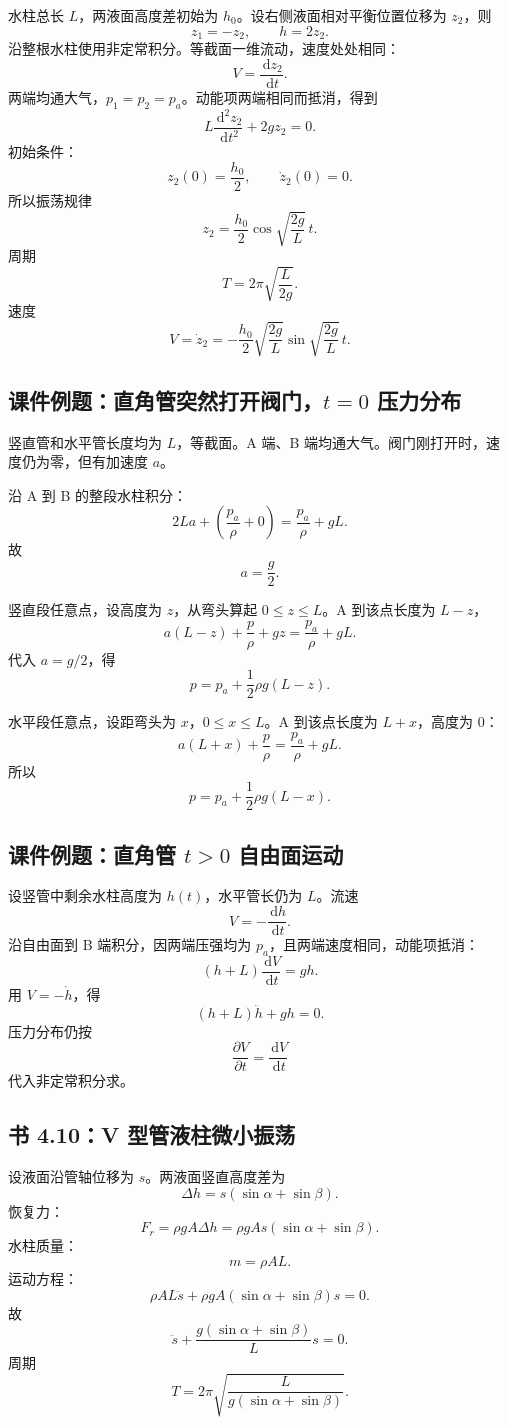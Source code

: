 ﻿\documentclass[UTF8,zihao=-4]{ctexart}
\newcommand{\dd}{\,\mathrm d}
\begin{document}
水柱总长 \(L\)，两液面高度差初始为 \(h_0\)。设右侧液面相对平衡位置位移为 \(z_2\)，则
\[
z_1=-z_2,\qquad h=2z_2.
\]
沿整根水柱使用非定常积分。等截面一维流动，速度处处相同：
\[
V=\frac{\dd z_2}{\dd t}.
\]
两端均通大气，\(p_1=p_2=p_a\)。动能项两端相同而抵消，得到
\[
L\frac{\dd^2z_2}{\dd t^2}+2gz_2=0.
\]
初始条件：
\[
z_2(0)=\frac{h_0}{2},\qquad \dot z_2(0)=0.
\]
所以振荡规律
\[
\boxed{
z_2=\frac{h_0}{2}\cos\sqrt{\frac{2g}{L}}\,t.}
\]
周期
\[
\boxed{
T=2\pi\sqrt{\frac{L}{2g}}.}
\]
速度
\[
\boxed{
V=\dot z_2
=-\frac{h_0}{2}\sqrt{\frac{2g}{L}}
\sin\sqrt{\frac{2g}{L}}\,t.}
\]

\subsection*{课件例题：直角管突然打开阀门，\(t=0\) 压力分布}

竖直管和水平管长度均为 \(L\)，等截面。A 端、B 端均通大气。阀门刚打开时，速度仍为零，但有加速度 \(a\)。

沿 A 到 B 的整段水柱积分：
\[
2La+\left(\frac{p_a}{\rho}+0\right)
=\frac{p_a}{\rho}+gL.
\]
故
\[
\boxed{a=\frac g2.}
\]

竖直段任意点，设高度为 \(z\)，从弯头算起 \(0\le z\le L\)。A 到该点长度为 \(L-z\)，
\[
a(L-z)+\frac p\rho+gz
=\frac{p_a}{\rho}+gL.
\]
代入 \(a=g/2\)，得
\[
\boxed{
p=p_a+\frac12\rho g(L-z).}
\]

水平段任意点，设距弯头为 \(x\)，\(0\le x\le L\)。A 到该点长度为 \(L+x\)，高度为 0：
\[
a(L+x)+\frac p\rho
=\frac{p_a}{\rho}+gL.
\]
所以
\[
\boxed{
p=p_a+\frac12\rho g(L-x).}
\]

\subsection*{课件例题：直角管 \(t>0\) 自由面运动}

设竖管中剩余水柱高度为 \(h(t)\)，水平管长仍为 \(L\)。流速
\[
V=-\frac{\dd h}{\dd t}.
\]
沿自由面到 B 端积分，因两端压强均为 \(p_a\)，且两端速度相同，动能项抵消：
\[
(h+L)\frac{\dd V}{\dd t}=gh.
\]
用 \(V=-\dot h\)，得
\[
\boxed{
(h+L)\ddot h+gh=0.}
\]
压力分布仍按
\[
\frac{\partial V}{\partial t}=\frac{\dd V}{\dd t}
\]
代入非定常积分求。

\subsection*{书 4.10：V 型管液柱微小振荡}

设液面沿管轴位移为 \(s\)。两液面竖直高度差为
\[
\Delta h=s(\sin\alpha+\sin\beta).
\]
恢复力：
\[
F_r=\rho gA\Delta h
=\rho gA s(\sin\alpha+\sin\beta).
\]
水柱质量：
\[
m=\rho AL.
\]
运动方程：
\[
\rho AL\ddot s+\rho gA(\sin\alpha+\sin\beta)s=0.
\]
故
\[
\ddot s+\frac{g(\sin\alpha+\sin\beta)}{L}s=0.
\]
周期
\[
\boxed{
T=2\pi\sqrt{\frac{L}{g(\sin\alpha+\sin\beta)}}.}
\]
\end{document}
